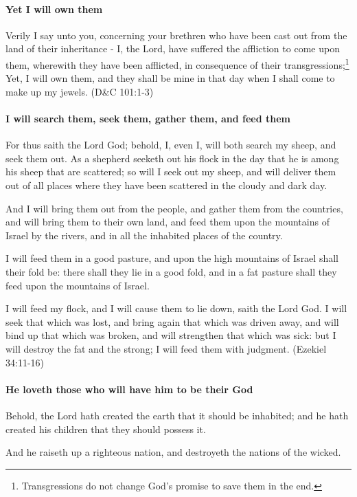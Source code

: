 \paragraph{Yet I will own them}
Verily I say unto you, concerning your brethren who have been cast out from the land of their inheritance - I, the Lord, have suffered the affliction to come upon them, wherewith they have been afflicted, in consequence of their transgressions;\footnote{Transgressions do not change God's promise to save them in the end.} Yet, I will own them, and they shall be mine in that day when I shall come to make up my jewels. (D\&C 101:1-3)

\paragraph{I will search them, seek them, gather them, and feed them}
For thus saith the Lord God; behold, I, even I, will both search my sheep, and seek them out. As a shepherd seeketh out his flock in the day that he is among his sheep that are scattered; so will I seek out my sheep, and will deliver them out of all places where they have been scattered in the cloudy and dark day.

And I will bring them out from the people, and gather them from the countries, and will bring them to their own land, and feed them upon the mountains of Israel by the rivers, and in all the inhabited places of the country. 

I will feed them in a good pasture, and upon the high mountains of Israel shall their fold be: there shall they lie in a good fold, and in a fat pasture shall they feed upon the mountains of Israel.

I will feed my flock, and I will cause them to lie down, saith the Lord God. I will seek that which was lost, and bring again that which was driven away, and will bind up that which was broken, and will strengthen that which was sick: but I will destroy the fat and the strong; I will feed them with judgment. (Ezekiel 34:11-16)

\paragraph{He loveth those who will have him to be their God}
Behold, the Lord hath created the earth that it should be inhabited; and he hath created his children that they should possess it.

And he raiseth up a righteous nation, and destroyeth the nations of the wicked.

